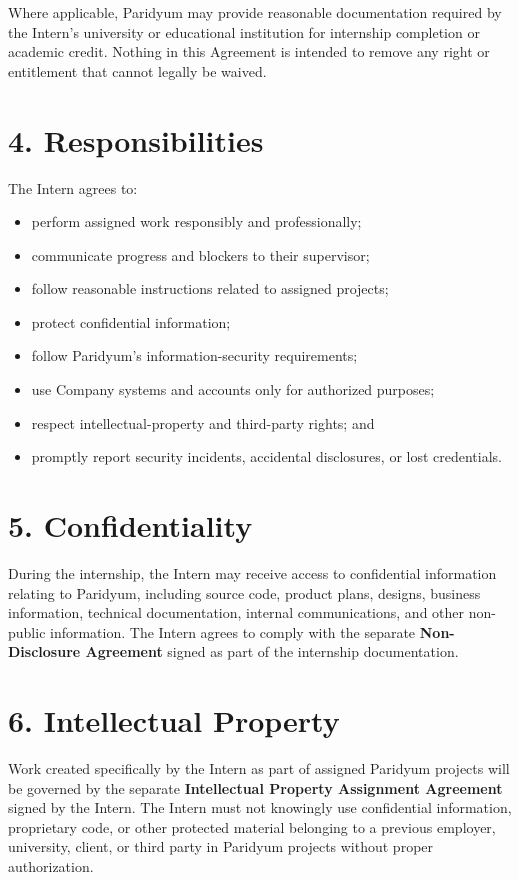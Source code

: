 \documentclass{paridyum}
\begin{document}
Where applicable, Paridyum may provide reasonable documentation required by the
Intern's university or educational institution for internship completion or academic
credit. Nothing in this Agreement is intended to remove any right or entitlement that
cannot legally be waived.

\section*{4. Responsibilities}
The Intern agrees to:
\begin{itemize}[leftmargin=*, noitemsep]
    \item perform assigned work responsibly and professionally;
    \item communicate progress and blockers to their supervisor;
    \item follow reasonable instructions related to assigned projects;
    \item protect confidential information;
    \item follow Paridyum's information-security requirements;
    \item use Company systems and accounts only for authorized purposes;
    \item respect intellectual-property and third-party rights; and
    \item promptly report security incidents, accidental disclosures, or lost
          credentials.
\end{itemize}

\section*{5. Confidentiality}
During the internship, the Intern may receive access to confidential information
relating to Paridyum, including source code, product plans, designs, business
information, technical documentation, internal communications, and other non-public
information. The Intern agrees to comply with the separate
\textbf{Non-Disclosure Agreement} signed as part of the internship documentation.

\section*{6. Intellectual Property}
Work created specifically by the Intern as part of assigned Paridyum projects will be
governed by the separate \textbf{Intellectual Property Assignment Agreement} signed by
the Intern. The Intern must not knowingly use confidential information, proprietary
code, or other protected material belonging to a previous employer, university,
client, or third party in Paridyum projects without proper authorization.
\end{document}
